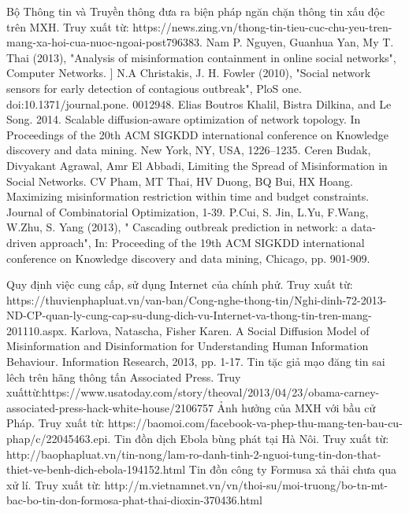 
\begin{thebibliography}{4}
	 Bộ Thông tin và Truyền thông đưa ra biện pháp ngăn chặn thông tin xấu độc trên MXH. Truy xuất từ: https://news.zing.vn/thong-tin-tieu-cuc-chu-yeu-tren-mang-xa-hoi-cua-nuoc-ngoai-post796383.
	 Nam P. Nguyen, Guanhua Yan, My T. Thai (2013), "Analysis of misinformation containment in online social networks", Computer Networks.
	 ] N.A Christakis, J. H. Fowler (2010), "Social network sensors for early detection of contagious outbreak", PloS one. doi:10.1371/journal.pone. 0012948.
	 Elias Boutros Khalil, Bistra Dilkina, and Le Song. 2014. Scalable diffusion-aware optimization of network topology. In Proceedings of the 20th ACM SIGKDD international conference on Knowledge discovery and data mining. New York, NY, USA, 1226–1235. 
	 Ceren Budak, Divyakant Agrawal, Amr El Abbadi, Limiting the Spread of Misinformation in Social Networks.
	 CV Pham, MT Thai, HV Duong, BQ Bui, HX Hoang. Maximizing misinformation restriction within time and budget constraints. Journal of Combinatorial Optimization, 1-39.
	 P.Cui, S. Jin, L.Yu, F.Wang, W.Zhu, S. Yang (2013), " Cascading outbreak prediction in network: a data-driven approach", In: Proceeding of the 19th ACM SIGKDD international conference on Knowledge discovery and data mining, Chicago, pp. 901-909.
	
	 Quy định việc cung cấp, sử dụng Internet của chính phử. Truy xuất từ: https://thuvienphapluat.vn/van-ban/Cong-nghe-thong-tin/Nghi-dinh-72-2013-ND-CP-quan-ly-cung-cap-su-dung-dich-vu-Internet-va-thong-tin-tren-mang-201110.aspx. 
	 Karlova, Natascha, Fisher Karen. A Social Diffusion Model of Misinformation and Disinformation for Understanding Human Information Behaviour. Information Research, 2013, pp. 1-17.
	Tin tặc giả mạo đăng tin sai lêch trên hãng thông tấn Associated Press. Truy xuấttừ:https://www.usatoday.com/story/theoval/2013/04/23/obama-carney-associated-press-hack-white-house/2106757
	 Ảnh hưởng của MXH với bầu cử Pháp. Truy xuất từ:  https://baomoi.com/facebook-va-phep-thu-mang-ten-bau-cu-phap/c/22045463.epi.
	 Tin đồn dịch Ebola bùng phát tại Hà Nôi. Truy xuất từ: http://baophapluat.vn/tin-nong/lam-ro-danh-tinh-2-nguoi-tung-tin-don-that-thiet-ve-benh-dich-ebola-194152.html
	 Tin đồn công ty Formusa xả thải chưa qua xử lí. Truy xuất từ: http://m.vietnamnet.vn/vn/thoi-su/moi-truong/bo-tn-mt-bac-bo-tin-don-formosa-phat-thai-dioxin-370436.html
	

\end{thebibliography}
